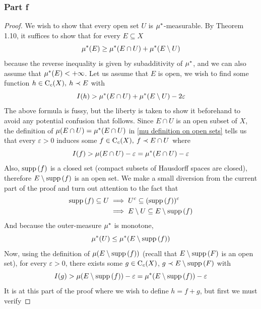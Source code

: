\documentclass[../../main.tex]{subfiles}
\begin{document}
\subsubsection{Part f}
\begin{proof}
We wish to show that every open set $U$ is $\mu^*$-measurable. By Theorem 1.10, it suffices to show that for every $E\subseteq X$
\begin{equation}\label{mustar measurable}
\mu^*(E) \geq \mu^*(E\cap U) +\mu^*(E\setminus U)
\end{equation}
because the reverse inequality is given by subadditivity of $\mu^*$, and we can also assume that $\mu^*(E)<+\infty$. Let us assume that $E$ is open, we wish to find some function $h\in\operatorname{C}_c({X}),\: h\prec E$ with
\[
I(h)> \mu^*(E\cap U) + \mu^*(E\setminus U) - 2\varepsilon
\]
The above formula is fussy, but the liberty is taken to show it beforehand to avoid any potential confusion that follows. Since $E\cap U$ is an open subset of $X$, the definition of $\mu(E\cap U) = \mu^*(E\cap U)$ in \eqref{mu definition on open sets} tells us that every $\varepsilon>0$ induces some $f\in\operatorname{C}_c({X}),\:f\prec E\cap U$ where
\begin{equation}\label{If part f}
    I(f)>\mu(E\cap U)-\varepsilon=\mu^*(E\cap U)-\varepsilon
\end{equation}
Also, $\operatorname{supp}{(f)}$ is a closed set (compact subsets of Hausdorff spaces are closed), therefore $E\setminus\operatorname{supp}{(f)}$ is an open set. We make a small diversion from the current part of the proof and turn out attention to the fact that
\begin{align*}
    \operatorname{supp}{(f)}\subseteq U&\implies U^c\subseteq (\operatorname{supp}{(f)})^c\\
    &\implies E\setminus U\subseteq E\setminus\operatorname{supp}{(f)}
\end{align*}
And because the outer-measure $\mu^*$ is monotone,
\begin{equation}\label{mustar motone part f Esuppf}
    \mu^*(U)\leq \mu^*(E\setminus \operatorname{supp}{(f)})
\end{equation}
Now, using the definition of $\mu(E\setminus\operatorname{supp}{(f)})$ (recall that $E\setminus\operatorname{supp}{(F)}$ is an open set), for every $\varepsilon>0$, there exists some $g\in\operatorname{C}_c({X})$, $g\prec E\setminus\operatorname{supp}{(F)}$ with
\begin{equation}\label{Ig part f}
I(g)>\mu(E\setminus \operatorname{supp}{(f)})-\varepsilon =\mu^*(E\setminus \operatorname{supp}{(f)})-\varepsilon
\end{equation}
It is at this part of the proof where we wish to define $h=f+g$, but first we must verify

\end{proof}
\end{document}
